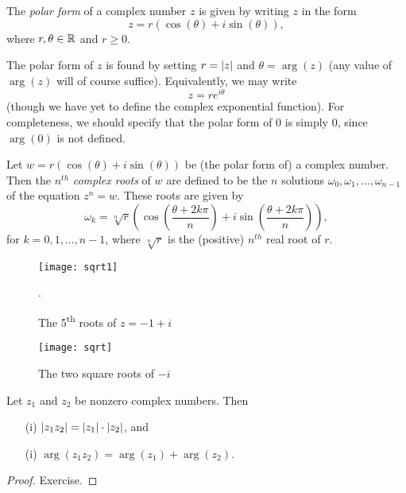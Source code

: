 \begin{definition}
The \emph{polar form} of a complex number $z$ is given by writing $z$ in the form
\[
z = r \left( \cos (\theta) + i \sin (\theta) \right),
\]
where $r , \theta \in \mathbb{R}$ and $r \geq 0$.
\end{definition}
The polar form of $z$ is found by setting $r = \left| z \right|$ and $\theta = \arg (z)$ (any value of $\arg(z)$ will of course suffice). { Equivalently, we may write
\[
z = r e^{i \theta}
\]
(though we have yet to define the complex exponential function).}  For completeness, we should specify that the polar form of $0$ is simply $0$, since $\arg (0)$ is not defined.



\begin{definition}
Let $w=r \left( \cos( \theta) + i \sin ( \theta) \right)$ be (the polar form of) a complex number.  Then the $n^{th}$ \emph{complex roots} of $w$ are defined to be the $n$ solutions $\omega_0, \omega_1, \ldots , \omega_{n-1}$ of the equation $z^n = w$.  These roots are given by
\[
\omega_{k} = \sqrt[n]{r} \left( \cos \left( \frac{\theta+2k \pi}{n} \right) + i \sin \left( \frac{\theta + 2k\pi}{n} \right) \right),
\]
for $k=0,1,\ldots,n-1$, where $\sqrt[n]{r}$ is the (positive) $n^{th}$ real root of $r$.
\end{definition}


\begin{figure}[h]
\centering
\texttt{[image: sqrt1]}
\caption{The 5\textsuperscript{th} roots of $z=-1+i$}.
\end{figure}




\begin{figure}[h]
\centering
\texttt{[image: sqrt]}
\caption{The two square roots of $-i$}
\end{figure}

\begin{theorem}
Let $z_1$ and $z_2$ be nonzero complex numbers.  Then
\begin{enumerate}
\item[(i)] $\left| z_1z_2 \right|=\left| z_1 \right| \cdot \left| z_2 \right|$, and
\item[(i)] $\arg (z_1z_2)=\arg(z_1)+\arg(z_2)$.
\end{enumerate}
\end{theorem}
\begin{proof}
Exercise.
\end{proof}



